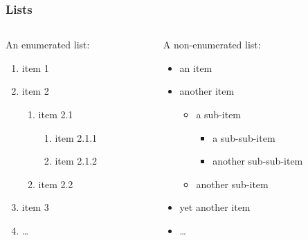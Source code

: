 \documentclass{beamer}
\begin{document}
\begin{frame}
\frametitle{Lists}
\begin{columns}
\begin{column}{0.5\textwidth}
An enumerated list:
\begin{enumerate}
\item item 1
\item item 2
\begin{enumerate}
\item item 2.1
\begin{enumerate}
\item item 2.1.1
\item item 2.1.2
\end{enumerate}
\item item 2.2
\end{enumerate}
\item item 3
\item \dots
\end{enumerate}
\end{column}
\begin{column}{0.5\textwidth}
A non-enumerated list:
\begin{itemize}
\item an item
\item another item
\begin{itemize}
\item a sub-item
\begin{itemize}
\item a sub-sub-item
\item another sub-sub-item
\end{itemize}
\item another sub-item
\end{itemize}
\item yet another item
\item \dots
\end{itemize}
\end{column}
\end{columns}
\end{frame}
\end{document}
